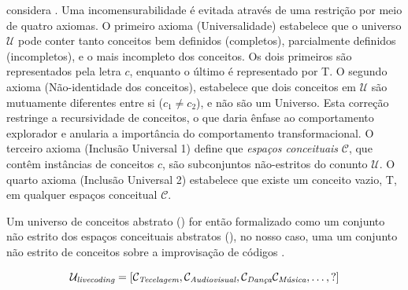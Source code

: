 \begin{citacao}
\end{citacao}

 considera  . Uma incomensurabilidade é evitada através de uma restrição por meio de quatro axiomas. O primeiro axioma (Universalidade) estabelece que o universo $\mathcal{U}$ pode conter tanto conceitos bem definidos (completos), parcialmente definidos (incompletos), e  o mais incompleto dos conceitos. Os dois primeiros são representados pela letra $c$, enquanto o último é representado por \small{T}. O segundo axioma (Não-identidade dos conceitos), estabelece que dois conceitos em  $\mathcal{U}$ são mutuamente diferentes entre si ($c_1 \neq c_2$), e não são um Universo. Esta correção restringe a recursividade de conceitos, o que daria ênfase ao comportamento explorador e anularia a importância do comportamento transformacional. O terceiro axioma (Inclusão Universal 1) define que \emph{espaços conceituais} $\mathcal{C}$, que contêm instâncias de conceitos $c$, são subconjuntos não-estritos do conunto $\mathcal{U}$. O quarto axioma (Inclusão Universal 2) estabelece que existe um conceito vazio, \small{T}, em qualquer espaços conceitual $\mathcal{C}$.


Um universo de conceitos abstrato () for então formalizado como um conjunto não estrito dos espaços conceituais abstratos (), no nosso caso, uma um conjunto não estrito de conceitos sobre a improvisação de códigos . 

\begin{equation}
\mathcal{U}_\emph{livecoding} = [\mathcal{C}_\emph{Tecelagem}, \mathcal{C}_\emph{Audiovisual}, \mathcal{C}_\emph{Dança} \mathcal{C}_\emph{Música}, \ldots, ?]
\end{equation}\label{eq:ul}

